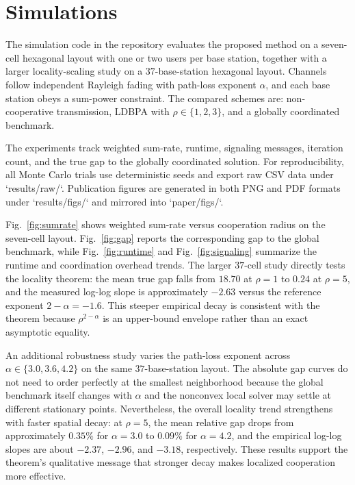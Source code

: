 \section{Simulations}

The simulation code in the repository evaluates the proposed method on a seven-cell hexagonal layout with one or two users per base station, together with a larger locality-scaling study on a $37$-base-station hexagonal layout. Channels follow independent Rayleigh fading with path-loss exponent $\alpha$, and each base station obeys a sum-power constraint. The compared schemes are: non-cooperative transmission, LDBPA with $\rho \in \{1,2,3\}$, and a globally coordinated benchmark.

The experiments track weighted sum-rate, runtime, signaling messages, iteration count, and the true gap to the globally coordinated solution. For reproducibility, all Monte Carlo trials use deterministic seeds and export raw CSV data under `results/raw/`. Publication figures are generated in both PNG and PDF formats under `results/figs/` and mirrored into `paper/figs/`.

Fig.~\ref{fig:sumrate} shows weighted sum-rate versus cooperation radius on the seven-cell layout. Fig.~\ref{fig:gap} reports the corresponding gap to the global benchmark, while Fig.~\ref{fig:runtime} and Fig.~\ref{fig:signaling} summarize the runtime and coordination overhead trends. The larger $37$-cell study directly tests the locality theorem: the mean true gap falls from $18.70$ at $\rho=1$ to $0.24$ at $\rho=5$, and the measured log-log slope is approximately $-2.63$ versus the reference exponent $2-\alpha=-1.6$. This steeper empirical decay is consistent with the theorem because $\rho^{2-\alpha}$ is an upper-bound envelope rather than an exact asymptotic equality.

An additional robustness study varies the path-loss exponent across $\alpha \in \{3.0, 3.6, 4.2\}$ on the same $37$-base-station layout. The absolute gap curves do not need to order perfectly at the smallest neighborhood because the global benchmark itself changes with $\alpha$ and the nonconvex local solver may settle at different stationary points. Nevertheless, the overall locality trend strengthens with faster spatial decay: at $\rho=5$, the mean relative gap drops from approximately $0.35\%$ for $\alpha=3.0$ to $0.09\%$ for $\alpha=4.2$, and the empirical log-log slopes are about $-2.37$, $-2.96$, and $-3.18$, respectively. These results support the theorem's qualitative message that stronger decay makes localized cooperation more effective.

